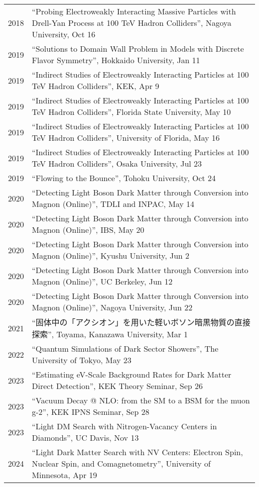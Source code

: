 \documentclass[12pt]{article}
\begin{document}
\begin{table}[H]\begin{tabular}{lp{6in}}2018 & ``Probing Electroweakly Interacting Massive Particles with Drell-Yan Process at 100 TeV Hadron Colliders'', Nagoya University, Oct 16 \\2019 & ``Solutions to Domain Wall Problem in Models with Discrete Flavor Symmetry'', Hokkaido University, Jan 11 \\2019 & ``Indirect Studies of Electroweakly Interacting Particles at 100 TeV Hadron Colliders'', KEK, Apr 9 \\2019 & ``Indirect Studies of Electroweakly Interacting Particles at 100 TeV Hadron Colliders'', Florida State University, May 10 \\2019 & ``Indirect Studies of Electroweakly Interacting Particles at 100 TeV Hadron Colliders'', University of Florida, May 16 \\2019 & ``Indirect Studies of Electroweakly Interacting Particles at 100 TeV Hadron Colliders'', Osaka University, Jul 23 \\2019 & ``Flowing to the Bounce'', Tohoku University, Oct 24 \\2020 & ``Detecting Light Boson Dark Matter through Conversion into Magnon (Online)'', TDLI and INPAC, May 14 \\2020 & ``Detecting Light Boson Dark Matter through Conversion into Magnon (Online)'', IBS, May 20 \\2020 & ``Detecting Light Boson Dark Matter through Conversion into Magnon (Online)'', Kyushu University, Jun 2 \\2020 & ``Detecting Light Boson Dark Matter through Conversion into Magnon (Online)'', UC Berkeley, Jun 12 \\2020 & ``Detecting Light Boson Dark Matter through Conversion into Magnon (Online)'', Nagoya University, Jun 22 \\2021 & ``固体中の「アクシオン」を用いた軽いボソン暗黒物質の直接探索'', Toyama, Kanazawa University, Mar 1 \\2022 & ``Quantum Simulations of Dark Sector Showers'', The University of Tokyo, May 23 \\2023 & ``Estimating eV-Scale Background Rates for Dark Matter Direct Detection'', KEK Theory Seminar, Sep 26 \\2023 & ``Vacuum Decay @ NLO: from the SM to a BSM for the muon g-2'', KEK IPNS Seminar, Sep 28 \\2023 & ``Light DM Search with Nitrogen-Vacancy Centers in Diamonds'', UC Davis, Nov 13 \\2024 & ``Light Dark Matter Search with NV Centers: Electron Spin, Nuclear Spin, and Comagnetometry'', University of Minnesota, Apr 19 \\\end{tabular}\end{table}
\end{document}
